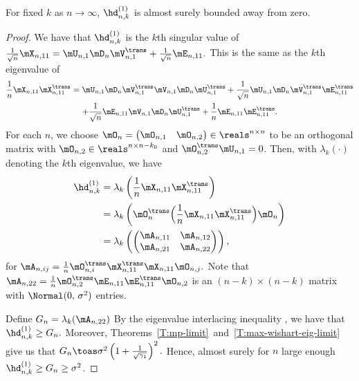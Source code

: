 \begin{lemma}\label{L:d1-bounded-away-from-0}
	For fixed $k$ as $n \to \infty$, 
	$\hd_{n,k}^{(1)} $ is almost surely bounded away from zero.
\end{lemma}
\begin{proof}
	We have that $\hd_{n,k}^{(1)}$ is the $k$th singular value of
	\(
		\frac{1}{\sqrt{n}} \mX_{n,11}
			=
				\mU_{n,1} \mD_n \mV_{n,1}^\trans
				+
				\frac{1}{\sqrt{n}}
				\mE_{n,11}.
	\)
	This is the same as the $k$th eigenvalue of
	\begin{multline*}
		\frac{1}{n} \mX_{n,11} \mX_{n,11}^\trans
			=
				\mU_{n,1} \mD_n \mV_{n,1}^\trans 
					\mV_{n,1} \mD_n \mU_{n,1}^\trans
				+
				\frac{1}{\sqrt{n}}
				\mU_{n,1} \mD_n \mV_{n,1}^\trans \mE_{n,11}^\trans \\
				+
				\frac{1}{\sqrt{n}}
				\mE_{n,11}
				\mV_{n,1} \mD_n \mU_{n,1}^\trans
				+
				\frac{1}{n}
				\mE_{n,11} \mE_{n,11}^\trans.
	\end{multline*}
	For each $n$, we choose 
	\(
		\mO_n
			=
			\left(
			\begin{matrix}
				\mO_{n,1} & \mO_{n,2}
			\end{matrix}
			\right)
		\in \reals^{n \times n}
	\)
	to be an orthogonal matrix with $\mO_{n,2} \in \reals^{n \times n-k_0}$ 
	and $\mO_{n,2}^\trans \mU_{n,1} = 0$.
	Then, with $\lambda_k(\cdot)$ denoting the $k$th eigenvalue, we have
	\begin{align*}
		\hd_{n,k}^{(1)}
			&=
				\lambda_k \left(
					\frac{1}{n} \mX_{n,11} \mX_{n,11}^\trans
				\right) \\
			&=
				\lambda_k \left(
					\mO_{n}^\trans
					\Big(
						\frac{1}{n} \mX_{n,11} \mX_{n,11}^\trans
					\Big)
					\mO_n
				\right) \\
			&=
				\lambda_k \left(
					\left(
					\begin{matrix}
						\mA_{n,11} & \mA_{n,12} \\
						\mA_{n,21} & \mA_{n,22}
					\end{matrix}
					\right)
				\right),
	\end{align*}
	for
	\(
		\mA_{n,ij} 
			= 
				\frac{1}{n}
				\mO_{n,i}^\trans 
				\mX_{n,11}^\trans \mX_{n,11}
				\mO_{n,j}.
	\)
	Note that
	\(
		\mA_{n,22} 
			= 
				\frac{1}{n} 
				\mO_{n,2}^\trans \mE_{n,11} \mE_{n,11}^\trans \mO_{n,2}
	\)
	is an $(n-k) \times (n-k)$ matrix with \iid $\Normal( 0, \, \sigma^2)$
	entries.
	
	Define $G_n = \lambda_k ( \mA_{n,22} )$
	By the eigenvalue interlacing inequality \cite{golub1996mc}, we have
	that
	\(
		\hd_{n,k}^{(1)}
			\geq
				G_n.
	\)
	Moreover, Theorems~\ref{T:mp-limit}~and~\ref{T:max-wishart-eig-limit}
	give us that 
	\(
		G_n
			\toas 
				\sigma^2
				\left(
					1 + \frac{1}{\sqrt{\gamma_1}}
				\right)^2.
	\)
	Hence, almost surely for $n$ large enough 
	$\hd_{n,k}^{(1)} \geq G_n \geq \sigma^2$.
\end{proof}

